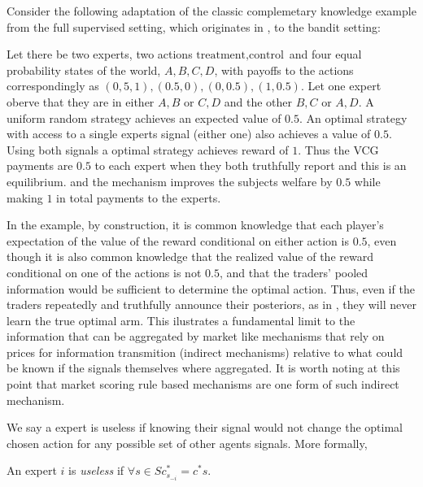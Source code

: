 Consider the following adaptation of the classic complemetary knowledge example from the full supervised setting, which originates in \cite{geanakoplos1982we}, to the bandit setting:

\begin{eg}\label{eg:comp-ex}
	Let there be two experts, two actions ${\text{treatment},\text{control}}$ and four equal probability states of the world, ${A,B,C,D}$, with payoffs to the actions correspondingly as ${(0,5,1),(0.5,0),(0,0.5),(1,0.5)}$. Let one expert oberve that they are in either ${A,B}$ or ${C,D}$ and the other ${B,C}$ or ${A,D}$. A uniform random strategy achieves an expected value of $0.5$. An optimal strategy with access to a single experts signal (either one) also achieves a value of $0.5$. Using both signals a optimal strategy achieves reward of $1$. Thus the VCG payments are $0.5$ to each expert when they both truthfully report and this is an equilibrium. and the mechanism improves the subjects welfare by $0.5$ while making $1$ in total payments to the experts. 
\end{eg}

In the example, by construction, it is common knowledge that each player’s expectation of the value of the reward conditional on either action is $0.5$, even though it is also common knowledge that the realized value of the reward conditional on one of the actions is not $0.5$, and that the traders’ pooled information would be sufficient to determine the optimal action. 
Thus, even if the traders repeatedly and truthfully announce their posteriors, as in \cite{geanakoplos1982we}, they will never learn the true optimal arm. 
This ilustrates a fundamental limit to the information that can be aggregated by market like mechanisms that rely on prices for information transmition (indirect mechanisms) relative to what could be known if the signals themselves where aggregated. 
It is worth noting at this point that market scoring rule based mechanisms are one form of such indirect mechanism.


We say a expert is useless if knowing their signal would not change the optimal chosen action for any possible set of other agents signals. More formally,

\begin{defn}\label{defn:useless}
	An expert $i$ is \emph{useless} if $\forall s  \in S c^{*}_{s_{-i}} = c^{*}{s}$.
\end{defn}

